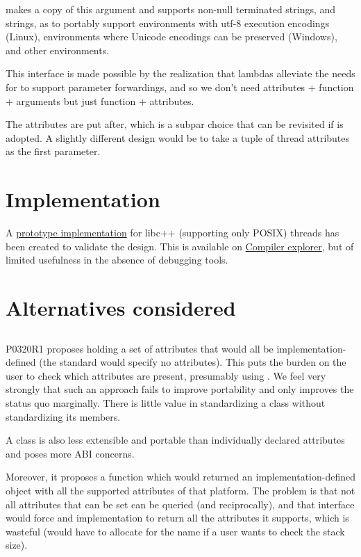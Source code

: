 \documentclass{wg21}
\begin{document}
 makes a copy of this argument and supports non-null terminated strings, and  strings, as to
portably support environments with utf-8 execution encodings (Linux), environments where Unicode encodings can be preserved (Windows),
and other environments.

This interface is made possible by the realization that lambdas alleviate the needs for  to support parameter forwardings,
and so we don't need attributes + function + arguments but just function + attributes.

The attributes are put after, which is a subpar choice that can be revisited if  is adopted.
A slightly different design would be to take a tuple of thread attributes as the first parameter.

\section{Implementation}

A \href{https://github.com/cor3ntin/llvm-project/tree/corentin/thread_name_p2019}{prototype implementation} for libc++ (supporting only POSIX) threads has been created to validate the design.
This is available on \href{https://compiler-explorer.com/z/MzGsndc7W}{Compiler explorer}, but of limited usefulness in the absence of debugging tools.

\section{Alternatives considered}

\subsection{}

P0320R1 proposes  holding a set of attributes that would all be implementation-defined (the standard would specify no attributes).
This puts the burden on the user to check which attributes are present, presumably using .
We feel very strongly that such an approach fails to improve portability and only improves the status quo marginally.
There is little value in standardizing a class without standardizing its members.

A class is also less extensible and portable than individually declared attributes and poses more ABI concerns.

Moreover, it proposes a  function which would returned an implementation-defined object
with all the supported attributes of that platform.
The problem is that not all attributes that can be set can be queried (and reciprocally), and that interface would force
and implementation to return all the attributes it supports, which is wasteful (would have to allocate for the name if a user wants to check the stack size).
\end{document}
